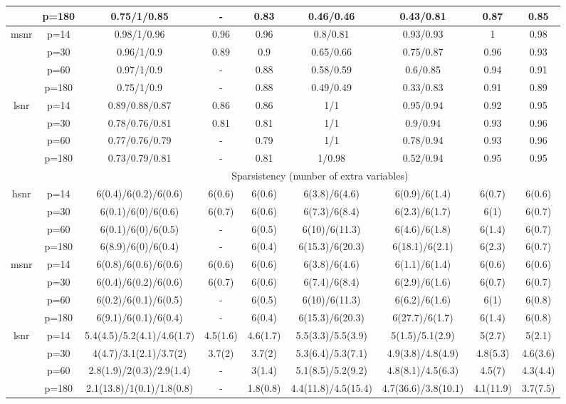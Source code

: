 \begin{table}[ht]
{\begin{tabular}{|c|c|ccccccc|}
   & p=180 & 0.75/1/0.85 & - & 0.83 & 0.46/0.46 & 0.43/0.81 & 0.87 & 0.85 \\ 
  \midrule\multirow{4}[2]{*}{msnr} & p=14 & 0.98/1/0.96 & 0.96 & 0.96 & 0.8/0.81 & 0.93/0.93 & 1 & 0.98 \\ 
   & p=30 & 0.96/1/0.9 & 0.89 & 0.9 & 0.65/0.66 & 0.75/0.87 & 0.96 & 0.93 \\ 
   & p=60 & 0.97/1/0.9 & - & 0.88 & 0.58/0.59 & 0.6/0.85 & 0.94 & 0.91 \\ 
   & p=180 & 0.75/1/0.9 & - & 0.88 & 0.49/0.49 & 0.33/0.83 & 0.91 & 0.89 \\ 
  \midrule\multirow{4}[2]{*}{lsnr} & p=14 & 0.89/0.88/0.87 & 0.86 & 0.86 & 1/1 & 0.95/0.94 & 0.92 & 0.95 \\ 
   & p=30 & 0.78/0.76/0.81 & 0.81 & 0.81 & 1/1 & 0.9/0.94 & 0.93 & 0.96 \\ 
   & p=60 & 0.77/0.76/0.79 & - & 0.79 & 1/1 & 0.78/0.94 & 0.93 & 0.96 \\ 
   & p=180 & 0.73/0.79/0.81 & - & 0.81 & 1/0.98 & 0.52/0.94 & 0.95 & 0.95 \\ 
   \midrule 
 \multicolumn{1}{|c}{} &       & \multicolumn{7}{c|}{Sparsistency (number of extra variables)} \\
\midrule\multirow{4}[2]{*}{hsnr} & p=14 & 6(0.4)/6(0.2)/6(0.6) & 6(0.6) & 6(0.6) & 6(3.8)/6(4.6) & 6(0.9)/6(1.4) & 6(0.7) & 6(0.6) \\ 
   & p=30 & 6(0.1)/6(0)/6(0.6) & 6(0.7) & 6(0.6) & 6(7.3)/6(8.4) & 6(2.3)/6(1.7) & 6(1) & 6(0.7) \\ 
   & p=60 & 6(0.1)/6(0)/6(0.5) & - & 6(0.5) & 6(10)/6(11.3) & 6(4.6)/6(1.8) & 6(1.4) & 6(0.7) \\ 
   & p=180 & 6(8.9)/6(0)/6(0.4) & - & 6(0.4) & 6(15.3)/6(20.3) & 6(18.1)/6(2.1) & 6(2.3) & 6(0.7) \\ 
  \midrule\multirow{4}[2]{*}{msnr} & p=14 & 6(0.8)/6(0.6)/6(0.6) & 6(0.6) & 6(0.6) & 6(3.8)/6(4.6) & 6(1.1)/6(1.4) & 6(0.6) & 6(0.6) \\ 
   & p=30 & 6(0.4)/6(0.2)/6(0.6) & 6(0.7) & 6(0.6) & 6(7.4)/6(8.4) & 6(2.9)/6(1.6) & 6(0.7) & 6(0.7) \\ 
   & p=60 & 6(0.2)/6(0.1)/6(0.5) & - & 6(0.5) & 6(10)/6(11.3) & 6(6.2)/6(1.6) & 6(1) & 6(0.8) \\ 
   & p=180 & 6(9.1)/6(0.1)/6(0.4) & - & 6(0.4) & 6(15.3)/6(20.3) & 6(27.7)/6(1.7) & 6(1.4) & 6(0.8) \\ 
  \midrule\multirow{4}[2]{*}{lsnr} & p=14 & 5.4(4.5)/5.2(4.1)/4.6(1.7) & 4.5(1.6) & 4.6(1.7) & 5.5(3.3)/5.5(3.9) & 5(1.5)/5.1(2.9) & 5(2.7) & 5(2.1) \\ 
   & p=30 & 4(4.7)/3.1(2.1)/3.7(2) & 3.7(2) & 3.7(2) & 5.3(6.4)/5.3(7.1) & 4.9(3.8)/4.8(4.9) & 4.8(5.3) & 4.6(3.6) \\ 
   & p=60 & 2.8(1.9)/2(0.3)/2.9(1.4) & - & 3(1.4) & 5.1(8.5)/5.2(9.2) & 4.8(8.1)/4.5(6.3) & 4.5(7) & 4.3(4.4) \\ 
   & p=180 & 2.1(13.8)/1(0.1)/1.8(0.8) & - & 1.8(0.8) & 4.4(11.8)/4.5(15.4) & 4.7(36.6)/3.8(10.1) & 4.1(11.9) & 3.7(7.5) \\ 
   \bottomrule 
\end{tabular}
}
\end{table}
